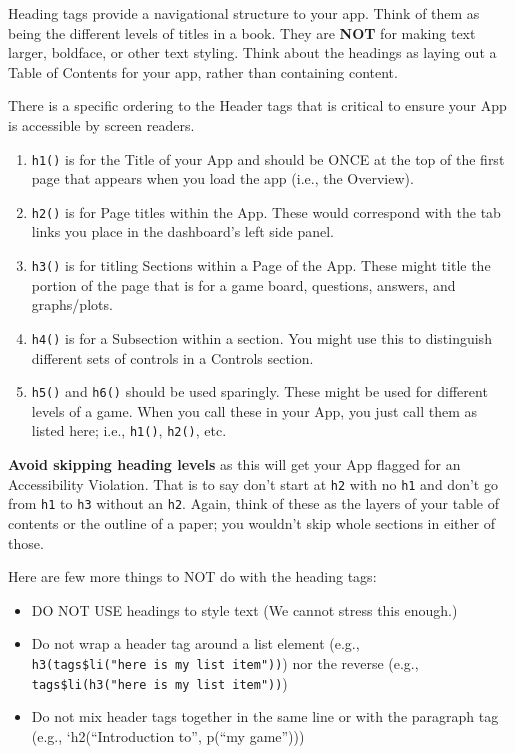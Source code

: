 \documentclass[
]{book}
\providecommand{\tightlist}{%
  \setlength{\itemsep}{0pt}\setlength{\parskip}{0pt}}
\begin{document}
Heading tags provide a navigational structure to your app. Think of them as being the different levels of titles in a book. They are \textbf{NOT} for making text larger, boldface, or other text styling. Think about the headings as laying out a Table of Contents for your app, rather than containing content.

There is a specific ordering to the Header tags that is critical to ensure your App is accessible by screen readers.

\begin{enumerate}
\def\labelenumi{\arabic{enumi}.}
\tightlist
\item
  \texttt{h1()} is for the Title of your App and should be ONCE at the top of the first page that appears when you load the app (i.e., the Overview).
\item
  \texttt{h2()} is for Page titles within the App. These would correspond with the tab links you place in the dashboard's left side panel.
\item
  \texttt{h3()} is for titling Sections within a Page of the App. These might title the portion of the page that is for a game board, questions, answers, and graphs/plots.
\item
  \texttt{h4()} is for a Subsection within a section. You might use this to distinguish different sets of controls in a Controls section.
\item
  \texttt{h5()} and \texttt{h6()} should be used sparingly. These might be used for different levels of a game. When you call these in your App, you just call them as listed here; i.e., \texttt{h1()}, \texttt{h2()}, etc.
\end{enumerate}

\textbf{Avoid skipping heading levels} as this will get your App flagged for an Accessibility Violation. That is to say don't start at \texttt{h2} with no \texttt{h1} and don't go from \texttt{h1} to \texttt{h3} without an \texttt{h2}. Again, think of these as the layers of your table of contents or the outline of a paper; you wouldn't skip whole sections in either of those.

Here are few more things to NOT do with the heading tags:

\begin{itemize}
\tightlist
\item
  DO NOT USE headings to style text (We cannot stress this enough.)
\item
  Do not wrap a header tag around a list element (e.g., \texttt{h3(tags\$li("here\ is\ my\ list\ item"))}) nor the reverse (e.g., \texttt{tags\$li(h3("here\ is\ my\ list\ item"))})
\item
  Do not mix header tags together in the same line or with the paragraph tag (e.g., `h2(``Introduction to'', p(``my game'')))
\end{itemize}
\end{document}

